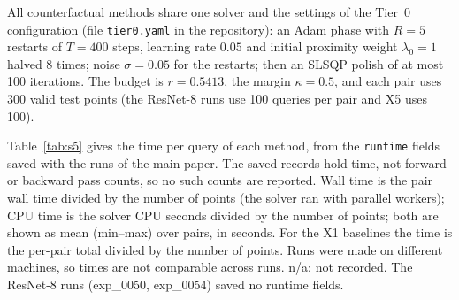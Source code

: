 \documentclass[10pt,a4paper]{article}
\theoremstyle{remark}
\begin{document}
All counterfactual methods share one solver and the settings of the Tier~0 configuration (file \texttt{tier0.yaml} in the repository): an Adam phase with $R=5$ restarts of $T=400$ steps, learning rate $0.05$ and initial proximity weight $\lambda_0=1$ halved 8 times; noise $\sigma=0.05$ for the restarts; then an SLSQP polish of at most 100 iterations. The budget is $r=0.5413$, the margin $\kappa=0.5$, and each pair uses 300 valid test points (the ResNet-8 runs use 100 queries per pair and X5 uses 100).

Table~\ref{tab:s5} gives the time per query of each method, from the \texttt{runtime} fields saved with the runs of the main paper. The saved records hold time, not forward or backward pass counts, so no such counts are reported. Wall time is the pair wall time divided by the number of points (the solver ran with parallel workers); CPU time is the solver CPU seconds divided by the number of points; both are shown as mean (min--max) over pairs, in seconds. For the X1 baselines the time is the per-pair total divided by the number of points. Runs were made on different machines, so times are not comparable across runs. n/a: not recorded. The ResNet-8 runs (exp\_0050, exp\_0054) saved no runtime fields.
\end{document}
